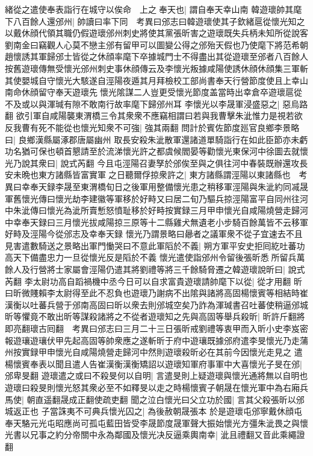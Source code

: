 緒從之遣使奉表詣行在城守以俟命　上之奉天也|{
	謂自奉天幸山南}
韓遊瓌帥其麾下八百餘人還邠州|{
	帥讀曰率下同　考異曰邠志曰韓遊瓌使其子欽緒扈從懷光知之以戴休顔代領其職仍假遊瓌邠州刺史將使其黨張昕害之遊瓌既失兵柄未知所從說客劉南金曰竊觀人心莫不戀主邠有留甲可以圖變公得之邠殆天假也乃使麾下將范希朝趙懷誘其軍歸邠士皆從之休顔率麾下卒據城門士不得盡出其從遊瓌至邠者八百餘人按舊遊瓌傳無受懷光邠州刺史事休顔傳云及李懷光叛據咸陽使誘休顔休顔集三軍斬其使嬰城自守懷光大駭遂自涇陽夜遁其月拜檢校工部尚書奉天行營節度使且上幸山南命休顔留守奉天遊瓌先懷光隂謀二人豈更受懷光節度盖當時出幸倉卒遊瓌扈從不及或以與渾瑊有隙不敢南行故率麾下歸邠州耳}
李懷光以李晟軍浸盛惡之|{
	惡烏路翻}
欲引軍自咸陽襲東渭橋三令其衆衆不應竊相謂曰若與我曹擊朱泚惟力是視若欲反我曹有死不能從也懷光知衆不可強|{
	強其兩翻}
問計於賓佐節度廵官良鄉李景略曰|{
	良鄉漢縣屬涿郡唐屬幽州}
取長安殺朱泚散軍還諸道單騎詣行在如此臣節亦未虧功名猶可保也頓首懇請至於流涕懷光許之都虞候閻晏等勸懷光東保河中徐圖去就懷光乃說其衆曰|{
	說式芮翻}
今且屯涇陽召妻孥於邠俟至與之俱往河中春裝既辦還攻長安未晩也東方諸縣皆富實軍之日聽爾俘掠衆許之|{
	東方諸縣謂涇陽以東諸縣也　考異曰幸奉天録李晟至東渭橋旬日之後軍用整備懷光患之稍移軍涇陽與朱泚約同㓕晟軍舊懷光傳曰懷光劫李建徽等軍移於好畤又曰居二旬乃驅兵掠涇陽富平自同州往河中朱泚傳曰懷光為泚所賣慙怒憤耻移於好畤按實録三月甲申懷光自咸陽燒營走歸河中幸奉天録曰三月懷光拔咸陽掠三原等十二縣雞犬無遺老小步騎百餘萬皆不云移軍好畤及涇陽今從邠志及幸奉天録}
懷光乃謂景略曰曏者之議軍衆不從子宜速去不且見害遣數騎送之景略出軍門慟哭曰不意此軍䧟於不義|{
	朔方軍平安史拒囘紇吐蕃功高天下備盡忠力一旦從懷光反是䧟於不義}
懷光遣使詣邠州令留後張昕悉所留兵萬餘人及行營將士家屬會涇陽仍遣其將劉禮等將三千餘騎脅遷之韓遊瓌說昕曰|{
	說式芮翻}
李太尉功高自蹈禍機中丞今日可以自求富貴遊瓌請帥麾下以從|{
	從才用翻}
昕曰昕微賤賴李太尉得至此不忍負也遊瓌乃謝病不出隂與諸將高固楊懷賓等相結時崔漢衡以吐蕃兵營于邠南高固曰昕以衆去則邠城空矣乃詐為渾瑊書召吐蕃使稍逼邠城昕等懼竟不敢出昕等謀殺諸將之不從者遊瓌知之先與高固等舉兵殺昕|{
	昕許斤翻將即亮翻瓌古囘翻　考異曰邠志曰三月二十三日張昕戒劉禮等衷甲而入昕小史李岌密報遊瓖遊瓖伏甲先起高固等帥衆應之遂斬昕于府中遊瓖既據邠府遣李旻懷光乃走蒲州按實録甲申懷光自咸陽燒營走歸河中然則遊瓌殺昕必在其前今因懷光走見之}
遣楊懷賓奉表以聞且遣人告崔漢衡漢衡矯詔以遊瓌知軍府事軍中大喜懷光子旻在邠|{
	邠卑旻翻}
遊瓌遣之或曰不殺旻何以自明|{
	言遣旻則上疑遊瓌與懷光通將無以自明也}
遊瓌曰殺旻則懷光怒其衆必至不如釋旻以走之時楊懷賓子朝晟在懷光軍中為右廂兵馬使|{
	朝直遥翻晟成正翻使疏吏翻}
聞之泣白懷光曰父立功於國|{
	言其父殺張昕以邠城返正也}
子當誅夷不可典兵懷光囚之|{
	為後赦朝晟張本}
於是遊瓌屯邠寧戴休顔屯奉天駱元光屯昭應尚可孤屯藍田皆受李晟節度晟軍聲大振始懷光方彊朱泚畏之與懷光書以兄事之約分帝關中永為鄰國及懷光决反逼乘輿南幸|{
	泚且禮翻又音此乘繩證翻}
